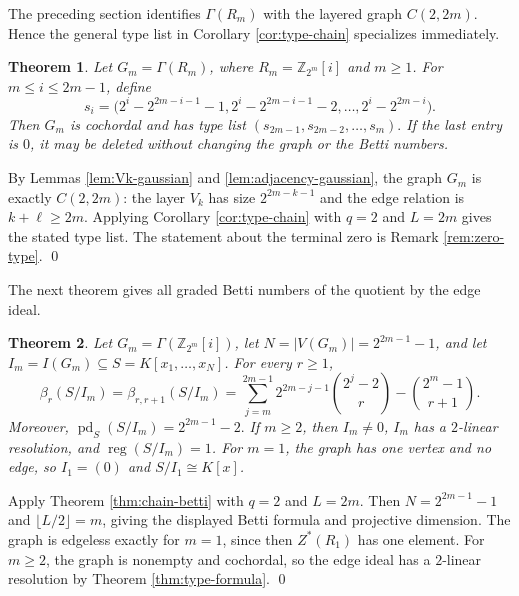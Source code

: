 \documentclass[12pt]{article}
\newtheorem{theorem}{Theorem}[section]
\theoremstyle{definition}
\renewenvironment{proof}{{\bf \noindent Proof.}}{\qed}
\begin{document}
\medskip

The preceding section identifies $\Gamma(R_m)$ with the layered graph $C(2,2m)$.  Hence the general type list in Corollary \ref{cor:type-chain} specializes immediately.

\medskip

\begin{theorem}\label{thm:gaussian-type}
	Let $G_m=\Gamma(R_m)$, where $R_m=\mathbb{Z}_{2^m}[i]$ and $m\geq 1$.  For $m\leq i\leq 2m-1$, define
	$$
	s_i=\bigl(2^i-2^{2m-i-1}-1,
	2^i-2^{2m-i-1}-2,
	\ldots,
	2^i-2^{2m-i}\bigr).
	$$
	Then $G_m$ is cochordal and has type list
	$ (s_{2m-1},s_{2m-2},\ldots,s_m). $
	If the last entry is $0$, it may be deleted without changing the graph or the Betti numbers.
\end{theorem}

\begin{proof}
	By Lemmas \ref{lem:Vk-gaussian} and \ref{lem:adjacency-gaussian}, the graph $G_m$ is exactly $C(2,2m)$: the layer $V_k$ has size $2^{2m-k-1}$ and the edge relation is $k+\ell\geq 2m$.  Applying Corollary \ref{cor:type-chain} with $q=2$ and $L=2m$ gives the stated type list.  The statement about the terminal zero is Remark \ref{rem:zero-type}.
\end{proof}

\medskip

The next theorem gives all graded Betti numbers of the quotient by the edge ideal.

\medskip

\begin{theorem}\label{thm:gaussian-betti}
	Let $G_m=\Gamma(\mathbb{Z}_{2^m}[i])$, let $N=|V(G_m)|=2^{2m-1}-1$, and let $I_m=I(G_m)\subseteq S=K[x_1,\ldots,x_N]$.  For every $r\geq 1$,
	$$
	\beta_r(S/I_m)=\beta_{r,r+1}(S/I_m)=
	\sum_{j=m}^{2m-1}2^{2m-j-1}\binom{2^j-2}{r}
	-\binom{2^m-1}{r+1}.
	$$
	Moreover,
	$ \operatorname{pd}_S(S/I_m)=2^{2m-1}-2. $
	If $m\geq 2$, then $I_m\neq 0$, $I_m$ has a $2$-linear resolution, and $\operatorname{reg}(S/I_m)=1$.  For $m=1$, the graph has one vertex and no edge, so $I_1=(0)$ and $S/I_1\cong K[x]$.
\end{theorem}

\begin{proof}
	Apply Theorem \ref{thm:chain-betti} with $q=2$ and $L=2m$.  Then $N=2^{2m-1}-1$ and $\lfloor L/2\rfloor=m$, giving the displayed Betti formula and projective dimension.  The graph is edgeless exactly for $m=1$, since then $Z^*(R_1)$ has one element.  For $m\geq 2$, the graph is nonempty and cochordal, so the edge ideal has a $2$-linear resolution by Theorem \ref{thm:type-formula}.
\end{proof}
\end{document}
